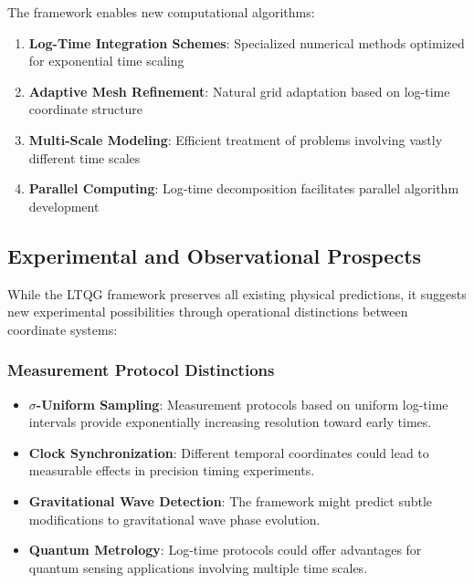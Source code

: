 The framework enables new computational algorithms:

\begin{enumerate}
\item \textbf{Log-Time Integration Schemes}: Specialized numerical methods optimized for exponential time scaling
\item \textbf{Adaptive Mesh Refinement}: Natural grid adaptation based on log-time coordinate structure
\item \textbf{Multi-Scale Modeling}: Efficient treatment of problems involving vastly different time scales
\item \textbf{Parallel Computing}: Log-time decomposition facilitates parallel algorithm development
\end{enumerate}

\subsection{Experimental and Observational Prospects}
\label{subsec:experimental_prospects}

While the LTQG framework preserves all existing physical predictions, it suggests new experimental possibilities through operational distinctions between coordinate systems:

\subsubsection{Measurement Protocol Distinctions}

\begin{itemize}
\item \textbf{$\sigma$-Uniform Sampling}: Measurement protocols based on uniform log-time intervals provide exponentially increasing resolution toward early times.

\item \textbf{Clock Synchronization}: Different temporal coordinates could lead to measurable effects in precision timing experiments.

\item \textbf{Gravitational Wave Detection}: The framework might predict subtle modifications to gravitational wave phase evolution.

\item \textbf{Quantum Metrology}: Log-time protocols could offer advantages for quantum sensing applications involving multiple time scales.
\end{itemize}

